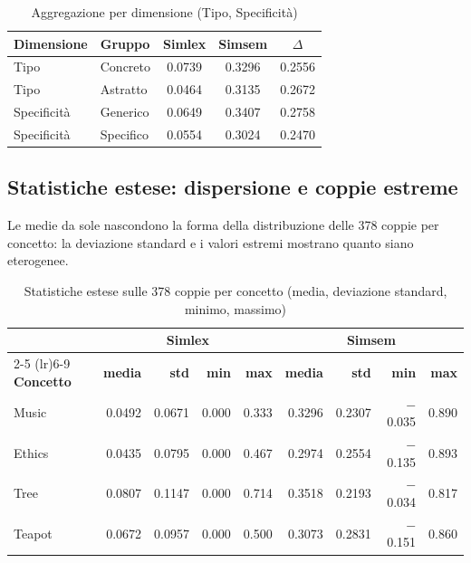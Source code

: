\documentclass[12pt,a4paper]{article}
\begin{document}
\begin{table}[H]
  \centering
  \caption{Aggregazione per dimensione (Tipo, Specificit\`a)}
  \begin{tabular}{llccc}
    \toprule
    \textbf{Dimensione} & \textbf{Gruppo} & \textbf{Simlex} & \textbf{Simsem} & \textbf{$\Delta$} \\
    \midrule
    Tipo          & Concreto  & 0.0739 & 0.3296 & 0.2556 \\
    Tipo          & Astratto  & 0.0464 & 0.3135 & 0.2672 \\
    Specificit\`a & Generico  & 0.0649 & 0.3407 & 0.2758 \\
    Specificit\`a & Specifico & 0.0554 & 0.3024 & 0.2470 \\
    \bottomrule
  \end{tabular}
\end{table}

\subsection{Statistiche estese: dispersione e coppie estreme}
\label{sec:risultati-estesi}

Le medie da sole nascondono la forma della distribuzione delle 378 coppie per concetto: la deviazione standard e i valori estremi mostrano quanto siano eterogenee.

\begin{table}[H]
  \centering
  \caption{Statistiche estese sulle 378 coppie per concetto (media, deviazione standard, minimo, massimo)}
  \small
  \begin{tabular}{lrrrrrrrr}
    \toprule
    & \multicolumn{4}{c}{\textbf{Simlex}} & \multicolumn{4}{c}{\textbf{Simsem}} \\
    \cmidrule(lr){2-5} \cmidrule(lr){6-9}
    \textbf{Concetto} & \textbf{media} & \textbf{std} & \textbf{min} & \textbf{max} & \textbf{media} & \textbf{std} & \textbf{min} & \textbf{max} \\
    \midrule
    Music  & 0.0492 & 0.0671 & 0.000 & 0.333 & 0.3296 & 0.2307 & $-$0.035 & 0.890 \\
    Ethics & 0.0435 & 0.0795 & 0.000 & 0.467 & 0.2974 & 0.2554 & $-$0.135 & 0.893 \\
    Tree   & 0.0807 & 0.1147 & 0.000 & 0.714 & 0.3518 & 0.2193 & $-$0.034 & 0.817 \\
    Teapot & 0.0672 & 0.0957 & 0.000 & 0.500 & 0.3073 & 0.2831 & $-$0.151 & 0.860 \\
    \bottomrule
  \end{tabular}
\end{table}
\end{document}
